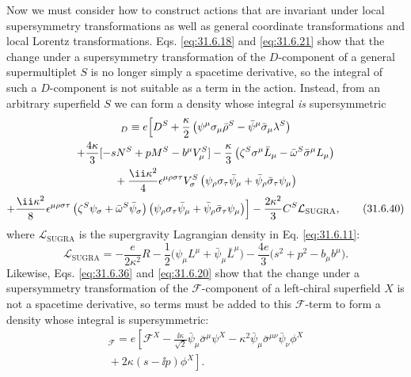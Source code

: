 Now we must consider how to construct actions that are invariant under
local supersymmetry transformations as well as general coordinate
transformations and local Lorentz transformations.
Eqs. \eqref{eq:31.6.18} and \eqref{eq:31.6.21} show that the change
under a supersymmetry transformation of the \(D\)-component of a
general supermultiplet \(S\) is no longer simply a spacetime derivative,
so the integral of such a \(D\)-component is not suitable as a term in
the action. Instead, from an arbitrary superfield \(S\) we can form a
density whose integral \emph{is} supersymmetric
\begin{multline}
  [S]_D\equiv
  e\Bigl[
    D^S+\frac{\kappa}{2}
      \left(
        \psi^\mu\sigma_\mu\bar\rho^S
        -\bar\psi^\mu\bar\sigma_\mu\lambda^S\right)\\
    +\frac{4\kappa}{3}
      [-sN^S+pM^S-b^\mu V_\mu^S]
    -\frac{\kappa}{3}
      \left(
        \zeta^S\sigma^\mu\bar L_\mu
        -\bar\omega^S\bar\sigma^\mu L_\mu\right)\\
    {}+\frac{\ii\kappa^2}{4}\epsilon^{\mu\rho\sigma\tau}V_\sigma^S
      \left(
        \psi_\rho\sigma_\tau\bar\psi_\mu
        +\bar\psi_\rho\bar\sigma_\tau\psi_\mu\right)\\
    +\frac{\ii\kappa^2}{8}\epsilon^{\mu\rho\sigma\tau}
      \left(\zeta^S\psi_\sigma
            +\bar\omega^S\bar\psi_\sigma\right)
      \left(
        \psi_\rho\sigma_\tau\bar\psi_\mu
        +\bar\psi_\rho\bar\sigma_\tau\psi_\mu\right)
  \Bigr]
  -\frac{2\kappa^2}{3}C^S\mathcal L_{\mathrm{SUGRA}},
  \tag{31.6.40}\label{eq:31.6.40}
\end{multline}
where \(\mathcal L_{\mathrm{SUGRA}}\) is the supergravity Lagrangian
density in Eq. \eqref{eq:31.6.11}:
\begin{equation}
  \mathcal L_{\mathrm{SUGRA}}
  =-\frac{e}{2\kappa^2}R
   -\frac{1}{2}\bigl(
     \psi_\mu L^\mu+\bar\psi_\mu\bar L^\mu\bigr)
   -\frac{4e}{3}\bigl(s^2+p^2-b_\mu b^\mu\bigr).
  \tag{31.6.41}\label{eq:31.6.41}
\end{equation}
Likewise, Eqs. \eqref{eq:31.6.36} and \eqref{eq:31.6.20} show that the
change under a supersymmetry transformation of the
\(\mathcal F\)-component of a left-chiral superfield \(X\) is not a
spacetime derivative, so terms must be added to this
\(\mathcal F\)-term to form a density whose integral is supersymmetric:
\begin{multline}
  [X]_{\mathcal F}
  =e\left[
    \mathcal F^X
    -\frac{\ii\kappa}{\sqrt{2}}
      \bar\psi_\mu\bar\sigma^\mu\psi^X
    -\kappa^2\bar\psi_\mu
      \bar\sigma^{\mu\nu}\bar\psi_\nu\phi^X\right.\\
  \left.
    {}+2\kappa(s-\ii p)\phi^X
  \right].
  \tag{31.6.42}\label{eq:31.6.42}
\end{multline}

